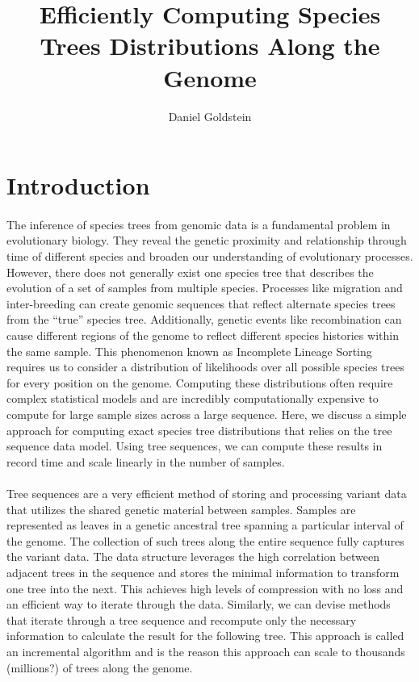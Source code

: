 \documentclass{article}
\begin{document}
\title{Efficiently Computing Species Trees Distributions Along the Genome}
\author{Daniel Goldstein}
\maketitle


\section{Introduction}
\paragraph{}
The inference of species trees from genomic data is a fundamental problem in
evolutionary biology. They reveal the genetic proximity and relationship
through time of different species and broaden our understanding of 
evolutionary processes. However, there does not generally exist one 
species tree that describes the evolution of a set of samples from multiple 
species. Processes like migration and inter-breeding can create genomic
sequences that reflect alternate species trees from the ``true''
species tree. Additionally, genetic events like recombination can cause 
different regions of the genome to reflect different species histories 
within the same sample. This phenomenon known as Incomplete Lineage Sorting
requires us to consider a distribution of likelihoods over all possible
species trees for every position on the genome. Computing these
distributions often require complex statistical models and are incredibly
computationally expensive to compute for large sample sizes across a large
sequence. Here, we discuss a simple approach for computing exact species
tree distributions that relies on the tree sequence data model. Using tree
sequences, we can compute these results in record time and scale linearly
in the number of samples.
\paragraph{}
Tree sequences are a very efficient method of storing and processing
variant data that utilizes the shared genetic material between samples.
Samples are represented as leaves in a genetic ancestral tree spanning
a particular interval of the genome. The collection of such trees along
the entire sequence fully captures the variant data. The data structure
leverages the high correlation between adjacent trees in the sequence and
stores the minimal information to transform one tree into the next. This
achieves high levels of compression with no loss and an efficient way
to iterate through the data.
Similarly, we can devise methods that iterate through a tree sequence and
recompute only the necessary information to calculate the result for the
following tree. This approach is called an incremental algorithm and is
the reason this approach can scale to thousands (millions?) of trees
along the genome.
\end{document}
